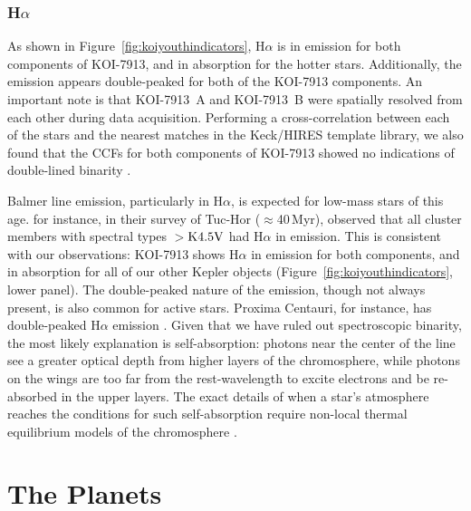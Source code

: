 \documentclass[12pt,twocolumn,tighten,linenumbers,trackchanges]{aastex63}
\begin{document}
\subsubsection{H$\alpha$}

As shown in Figure~\ref{fig:koiyouthindicators}, H$\alpha$ is in
emission for both components of KOI-7913, and in absorption for the
hotter stars.  Additionally, the emission appears double-peaked for
both of the KOI-7913 components.  An important note is that KOI-7913~A and
KOI-7913~B were spatially resolved from each other during data
acquisition.  Performing a cross-correlation between each of the stars
and the nearest matches in the Keck/HIRES template library, we also
found that the CCFs for both components of KOI-7913 showed no
indications of double-lined binarity \citep{kolbl_detection_2015}.

Balmer line emission, particularly in H$\alpha$, is expected for
low-mass stars of this age.  \citet{kraus_stellar_2014} for instance, in their
survey of Tuc-Hor ($\approx$40\,Myr), observed that all
cluster members with spectral types $>$${\rm K4.5V}$ had H$\alpha$ in
emission.  This is consistent with our observations: KOI-7913 shows
H$\alpha$ in emission for both components, and in absorption
for all of our other Kepler objects (Figure~\ref{fig:koiyouthindicators}, lower panel).  The double-peaked nature of the
emission, though not always present, is also common for
active stars.  Proxima Centauri, for instance, has double-peaked
H$\alpha$ emission \citep{collins_calculations_2017}.  Given
that we have ruled out spectroscopic binarity, the most
likely
explanation is self-absorption: photons near the center of the line
see a greater optical depth from higher layers of the chromosphere,
while photons on the wings are too far from the
rest-wavelength to excite electrons and be re-absorbed in the upper
layers.  The exact details of when a star's atmosphere reaches the
conditions for such self-absorption require non-local thermal
equilibrium models of the chromosphere
\citep{short_chromospheric_1998,2005A&A...439.1137F}.







\section{The Planets}
\label{sec:planets}
\end{document}
